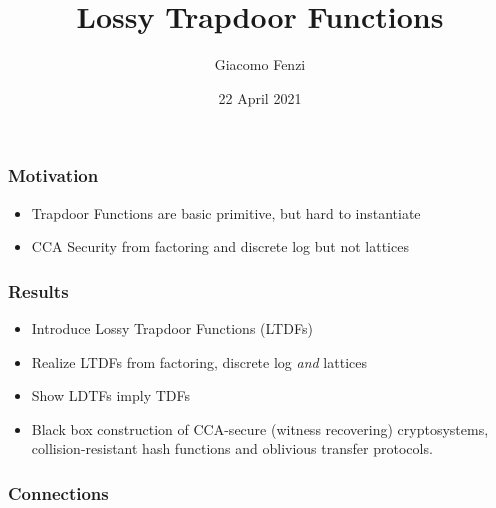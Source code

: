 \documentclass{beamer}
\title{Lossy Trapdoor Functions}
\author{Giacomo Fenzi}
\institute{ETH Zurich}
\date{22 April 2021}
\begin{document}
\frame{\titlepage}

\begin{frame}
    \frametitle{Motivation}
    \begin{itemize}
        \item Trapdoor Functions are basic primitive, but hard to instantiate
        \item CCA Security from factoring and discrete log but not lattices
    \end{itemize}


\end{frame}


\begin{frame}
    \frametitle{Results}
    \begin{itemize}
        \item Introduce Lossy Trapdoor Functions (LTDFs)
        \item Realize LTDFs from factoring, discrete log \textit{and} lattices
        \item Show LDTFs imply TDFs
        \item Black box construction of CCA-secure (witness recovering) cryptosystems,
              collision-resistant hash functions and oblivious transfer protocols.
    \end{itemize}

\end{frame}

\begin{frame}
    \frametitle{Connections}
    \begin{center}
    \end{center}
\end{frame}
\end{document}
